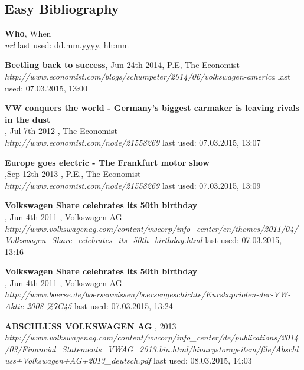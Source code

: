 \documentclass[12pt]{article}
\begin{document}
\subsection{Easy Bibliography}
\begin{thebibliography}{56}

   \textbf{Who}, When\\
  \textit{url}
  \newline last used: dd.mm.yyyy, hh:mm
 
  \textbf{Beetling back to success}, Jun 24th 2014, P.E, The Economist\\
  \textit{http://www.economist.com/blogs/schumpeter/2014/06/volkswagen-america}
  \newline last used: 07.03.2015, 13:00
  
   
  \textbf{VW conquers the world - Germany’s biggest carmaker is leaving rivals in the dust}\\, Jul 7th 2012 , The Economist\\
  \textit{  http://www.economist.com/node/21558269}
  \newline last used: 07.03.2015, 13:07
  
    
   
  \textbf{Europe goes electric - The Frankfurt motor show
}\\,Sep 12th 2013 , P.E., The Economist\\
  \textit{  http://www.economist.com/node/21558269}
  \newline last used: 07.03.2015, 13:09
  
  \textbf{Volkswagen Share celebrates its 50th birthday}\\, Jun 4th 2011 , Volkswagen AG\\
  \textit{http://www.volkswagenag.com/content/vwcorp/info\_center/en/themes/2011/04/Volkswagen\_Share\_celebrates\_its\_50th\_birthday.html
}
  \newline last used: 07.03.2015, 13:16
  
  \textbf{Volkswagen Share celebrates its 50th birthday}\\, Jun 4th 2011 , Volkswagen AG\\
  \textit{  http://www.boerse.de/boersenwissen/boersengeschichte/Kurskapriolen-der-VW-Aktie-2008-\%7C45}
  \newline last used: 07.03.2015, 13:24
  

  \textbf{ABSCHLUSS VOLKSWAGEN AG }, 2013 \\
  \textit{ http://www.volkswagenag.com/content/vwcorp/info\_center/de/publications/2014/03/Financial\_Statements\_VWAG\_2013.bin.html/binarystorageitem/file/Abschluss+Volkswagen+AG+2013\_deutsch.pdf  
}
  \newline last used: 08.03.2015, 14:03
    

\end{thebibliography}
\end{document}

